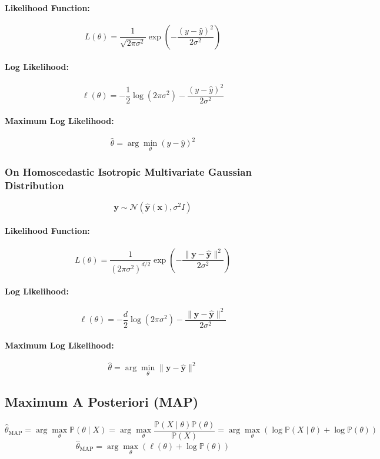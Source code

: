 \documentclass{article}
\begin{document}
\paragraph{Likelihood Function:}
\[
    L(\theta) = \frac{1}{\sqrt{2\pi\sigma^2}} \exp\left(-\frac{(y-\hat{y})^2}{2\sigma^2}\right)
\]
\paragraph{Log Likelihood:}
\[
    \ell(\theta) = -\frac{1}{2}\log(2\pi\sigma^2) - \frac{(y-\hat{y})^2}{2\sigma^2}
\]
\paragraph{Maximum Log Likelihood:}
\[
    \hat{\theta} = \arg\min_{\theta} (y-\hat{y})^2
\]

\subsubsection{On Homoscedastic Isotropic Multivariate Gaussian Distribution}
\[
    \mathbf{y} \sim \mathcal{N}(\hat{\mathbf{y}}(\mathbf{x}), \sigma^2 I)
\]
\paragraph{Likelihood Function:}
\[
    L(\theta) = \frac{1}{(2\pi\sigma^2)^{d/2}} \exp\left(-\frac{\|\mathbf{y}-\hat{\mathbf{y}}\|^2}{2\sigma^2}\right)
\]
\paragraph{Log Likelihood:}
\[
    \ell(\theta) = -\frac{d}{2}\log(2\pi\sigma^2) - \frac{\|\mathbf{y}-\hat{\mathbf{y}}\|^2}{2\sigma^2}
\]
\paragraph{Maximum Log Likelihood:}
\[
    \hat{\theta} = \arg\min_{\theta} \|\mathbf{y}-\hat{\mathbf{y}}\|^2
\]


\subsection{Maximum A Posteriori (MAP)}

\[
    \hat{\theta}_{\text{MAP}} = \arg\max_{\theta} \mathbb{P}(\theta \mid X) = \arg\max_{\theta} \frac{\mathbb{P}(X \mid \theta) \mathbb{P}(\theta)}{\mathbb{P}(X)} = \arg\max_{\theta} \left( \log \mathbb{P}(X \mid \theta) + \log \mathbb{P}(\theta) \right)
\]
\[
    \hat{\theta}_{\text{MAP}} = \arg\max_{\theta} \left( \ell(\theta) + \log \mathbb{P}(\theta) \right)
\]
\end{document}
